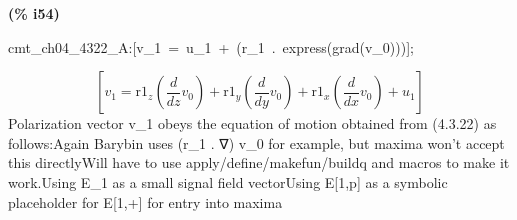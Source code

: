 \documentclass[fleqn]{article}
\begin{document}
\noindent
\begin{minipage}[t]{4.000000em}\color{red}\bfseries
(\% i54)	
\end{minipage}
\begin{minipage}[t]{\textwidth}\color{blue}
cmt\_ch04\_4322\_A:[v\_1\ =\ u\_1\ +\ (r\_1\ .\ express(grad(v\_0)))];
\end{minipage}
\[\displaystyle \tag{\% o54} 
\left[ {v_1}={{\ensuremath{\mathrm{r1}}}_z} \left( \frac{d}{d z} {v_0}\right) +{{\ensuremath{\mathrm{r1}}}_y} \left( \frac{d}{d y} {v_0}\right) +{{\ensuremath{\mathrm{r1}}}_x} \left( \frac{d}{d x} {v_0}\right) +{u_1}\right] \mbox{}
\]
Polarization vector v\_1 obeys the equation of motion obtained from (4.3.22) as follows:Again Barybin uses (r\_1 . ∇) v\_0 for example, but maxima won't accept this directlyWill have to use apply/define/makefun/buildq and macros to make it work.Using E\_1 as a small signal field vectorUsing E[1,p] as a symbolic placeholder for E[1,+] for entry into maxima
\end{document}
